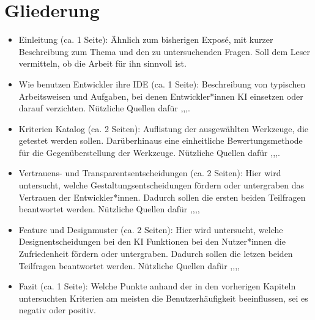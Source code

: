 \documentclass[ngerman]{article}
\begin{document}
\section{Gliederung}
    \begin{itemize}
        \item Einleitung (ca. 1 Seite): Ähnlich zum bisherigen Exposé, mit kurzer Beschreibung zum Thema und den zu untersuchenden Fragen. Soll dem Leser vermitteln, ob die Arbeit für ihn sinnvoll ist.
        \item Wie benutzen Entwickler ihre IDE (ca. 1 Seite): Beschreibung von typischen Arbeitsweisen und Aufgaben, bei denen Entwickler*innen KI einsetzen oder darauf verzichten. Nützliche Quellen dafür \cite{barke2022groundedcopilotprogrammersinteract},\cite{10.1145/3832783.3834377},\cite{Sergeyuk_2025},\cite{sergeyuk2026evolving}.
        \item Kriterien Katalog (ca. 2 Seiten): Auflistung der ausgewählten Werkzeuge, die getestet werden sollen. Darüberhinaus eine einheitliche Bewertungsmethode für die Gegenüberstellung der Werkzeuge. Nützliche Quellen dafür \cite{Ivory2001},\cite{Sergeyuk_2025},\cite{akhond2026impossible},\cite{10.1007/978-3-032-22937-3_5}.
        \item Vertrauens- und Transparentsentscheidungen (ca. 2 Seiten): Hier wird untersucht, welche Gestaltungsentscheidungen fördern oder untergraben das Vertrauen der Entwickler*innen. Dadurch sollen die ersten beiden Teilfragen beantwortet werden. Nützliche Quellen dafür \cite{10.1007/978-3-032-22937-3_5},\cite{akhond2026impossible},\cite{Sergeyuk_2025},\cite{10.1145/3832783.3834377},\cite{barke2022groundedcopilotprogrammersinteract}
        \item Feature und Designmuster (ca. 2 Seiten): Hier wird untersucht, welche Designentscheidungen bei den KI Funktionen bei den Nutzer*innen die Zufriedenheit fördern oder untergraben. Dadurch sollen die letzen beiden Teilfragen beantwortet werden. Nützliche Quellen dafür \cite{10.1145/3832783.3834377},\cite{sergeyuk2026evolving},\cite{barke2022groundedcopilotprogrammersinteract},\cite{Sergeyuk_2025},\cite{10.1007/978-3-032-22937-3_5}
        \item Fazit (ca. 1 Seite): Welche Punkte anhand der in den vorherigen Kapiteln untersuchten Kriterien am meisten die Benutzerhäufigkeit beeinflussen, sei es negativ oder positiv.
    \end{itemize}

\end{document}

